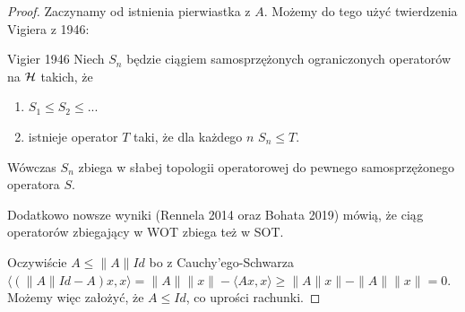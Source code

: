 \begin{proof}
  Zaczynamy od istnienia pierwiastka z $A$. Możemy do tego użyć twierdzenia Vigiera z 1946:
  \begin{theorem}{Vigier 1946}{}
    Niech $S_n$ będzie ciągiem samosprzężonych ograniczonych operatorów na $\operatorname{\mathcal{H}}$ takich, że 
    \begin{enumerate}
      \item $S_1\leq S_2\leq ...$
      \item istnieje operator $T$ taki, że dla każdego $n$ $S_n\leq T$.
    \end{enumerate}
    Wówczas $S_n$ zbiega w słabej topologii operatorowej do pewnego samosprzężonego operatora $S$.
  \end{theorem}
  Dodatkowo nowsze wyniki (Rennela 2014 oraz Bohata 2019) mówią, że ciąg operatorów zbiegający w WOT zbiega też w SOT.

  Oczywiście $A\leq \|A\|Id$ bo z Cauchy'ego-Schwarza $\langle(\|A\|Id-A)x, x\rangle=\|A\|\|x\|-\langle Ax, x\rangle\geq \|A\|x\|-\|A\|\|x\|=0$. Możemy więc założyć, że $A\leq Id$, co uprości rachunki.


\end{proof}
